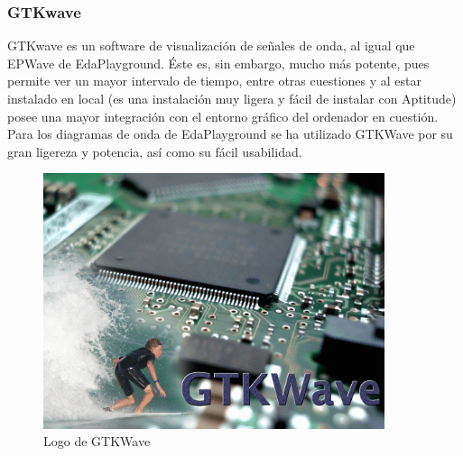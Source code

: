 \subsubsection{GTKwave}
\label{st:gtkwave}
GTKwave es un software de visualización de señales de onda, al igual que EPWave de EdaPlayground. Éste es, sin embargo, mucho más potente, pues permite ver un mayor intervalo de tiempo, entre otras cuestiones y al estar instalado en local (es una instalación muy ligera y fácil de instalar con Aptitude) posee una mayor integración con el entorno gráfico del ordenador en cuestión. Para los diagramas de onda de EdaPlayground se ha utilizado GTKWave por su gran ligereza y potencia, así como su fácil usabilidad.

\begin{figure}[!ht]
  \centering
  \includegraphics[width=10cm]{figures/gtkwaveLogo.png}
  \caption{Logo de GTKWave}
  \label{fig:gtkwaveLogo}
\end{figure}